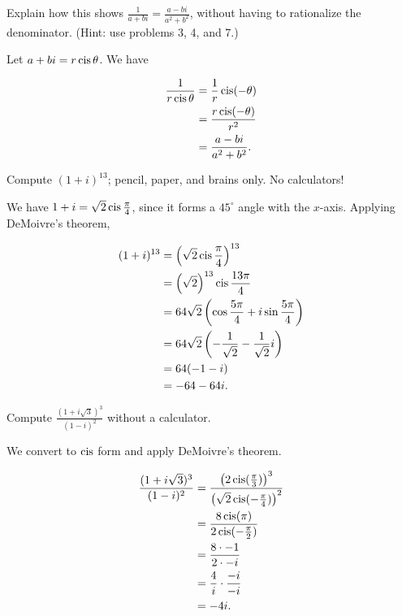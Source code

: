 \documentclass[../key.tex]{subfiles}
\begin{document}
\begin{inner_problem}
\item Explain how this shows $\frac{1}{a+bi}=\frac{a-bi}{a^2+b^2}$, without having to rationalize the denominator. (Hint: use problems 3, 4, and 7.)
\end{inner_problem}

Let $a+bi=r\operatorname{cis}\theta$. We have

\begin{align*}
\frac{1}{r\operatorname{cis}\theta} &= \frac{1}{r}\operatorname{cis} (-\theta) \\
&= \frac{r\operatorname{cis} (-\theta)}{r^2} \\
&= \frac{a-bi}{a^2+b^2}.
\end{align*}

\begin{outer_problem}
\item Compute $(1+i)^{13}$; pencil, paper, and brains only. No calculators!
\end{outer_problem}

We have $1+i=\sqrt{2} \operatorname{cis} \frac{\pi}{4}$, since it forms a $45^\circ$ angle with the $x$-axis. Applying DeMoivre's theorem,

\begin{align*}
(1+i)^{13} &= \left(\sqrt{2} \operatorname{cis} \frac{\pi}{4}\right)^{13} \\
&= \left(\sqrt{2}\right)^{13} \operatorname{cis} \frac{13\pi}{4} \\
&= 64\sqrt{2} \left(\cos \frac{5\pi}{4} + i\sin \frac{5\pi}{4}\right) \\
&= 64\sqrt{2} \left(-\frac{1}{\sqrt{2}} - \frac{1}{\sqrt{2}}i\right) \\
&= 64 (-1-i) \\
&= -64-64i.
\end{align*}

\begin{outer_problem}
\item Compute $\frac{(1+i\sqrt{3})^3}{(1-i)^2}$ without a calculator.
\end{outer_problem}

We convert to $\operatorname{cis}$ form and apply DeMoivre's theorem.

\begin{align*}
\frac{(1+i\sqrt{3})^3}{(1-i)^2} &= \frac{\left(2\operatorname{cis} (\frac{\pi}{3})\right)^3}{\left(\sqrt{2}\operatorname{cis} (-\frac{\pi}{4})\right)^2} \\
&= \frac{8\operatorname{cis}(\pi)}{2\operatorname{cis} (-\frac{\pi}{2})} \\
&= \frac{8 \cdot -1}{2 \cdot -i} \\
&= \frac{4}{i}\cdot \frac{-i}{-i} \\
&= -4i.
\end{align*}
\end{document}

